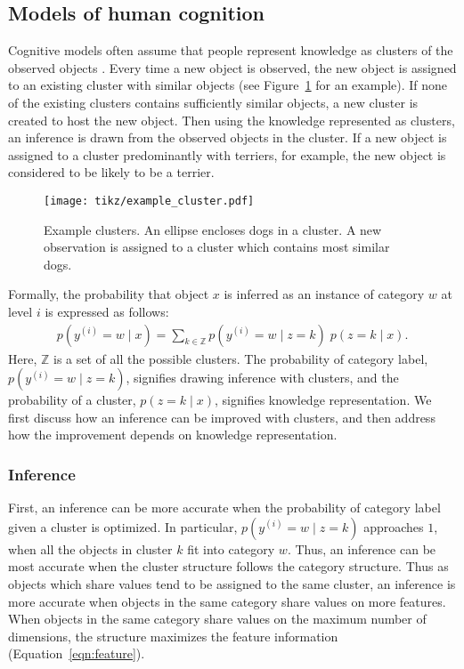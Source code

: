 \documentclass[doc]{apa6}
\begin{document}
\subsection*{Models of human cognition}

Cognitive models often assume that people represent knowledge as clusters of the observed objects
\parencite[e.g.,][]{Anderson1991a, Love2004a, Sanborn2010a}. Every time a new object is observed,
the new object is assigned to an existing cluster with similar objects (see Figure~\ref{fig:cluster}
for an example). If none of the existing clusters contains sufficiently similar objects, a new
    cluster is created to host the new object.  Then using the knowledge represented as clusters, an
    inference is drawn from the observed objects in the cluster.  If a new object is assigned to a
    cluster predominantly with terriers, for example, the new object is considered to be likely to
    be a terrier.

\begin{figure}
    \centering

    \texttt{[image: tikz/example\_cluster.pdf]}
    \vspace{6pt}

    \caption{Example clusters. An ellipse encloses dogs in a cluster. A new observation is assigned
    to a cluster which contains most similar dogs.}

\label{fig:cluster}
\end{figure}

Formally, the probability that object $x$ is inferred as an instance of category $w$ at
level $i$ is expressed as follows:
\begin{align}
    p(y^{(i)} = w\; \vert \; x) = \sum_{k \in \mathbb{Z}}
    p(y^{(i)} = w \; \vert \; z = k)
    \;
    p(z = k \; \vert \; x).
\end{align}
Here, $\mathbb{Z}$ is a set of all the possible clusters. The probability of category label,
$p(y^{(i)} = w \; \vert \; z = k)$, signifies drawing inference with clusters, and the probability
of a cluster, $p(z = k \; \vert \; x)$, signifies knowledge representation. We first discuss how an
inference can be improved with clusters, and then address how the improvement depends on knowledge
representation.

\subsubsection*{Inference}

First, an inference can be more accurate when the probability of category label given a cluster is
optimized. In particular, $p(y^{(i)} = w \; \vert \; z = k)$ approaches $1$, when all the objects in
cluster $k$ fit into category $w$. Thus, an inference can be most accurate when the cluster
structure follows the category structure.  Thus as objects which share values tend to be assigned to
the same cluster, an inference is more accurate when objects in the same category share values on
more features. When objects in the same category share values on the maximum number of dimensions,
the structure maximizes the feature information (Equation~\ref{eqn:feature}).
\end{document}
